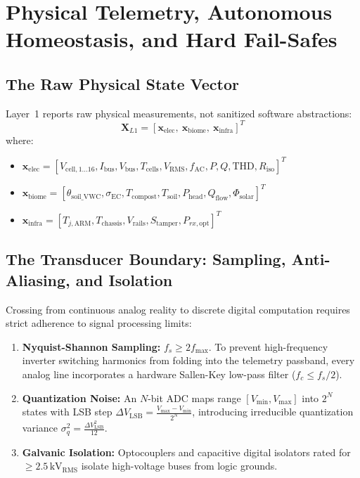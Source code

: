 \section{Physical Telemetry, Autonomous Homeostasis, and Hard Fail-Safes}
\label{sec:l1_telemetry_failsafes}

\subsection{The Raw Physical State Vector}

Layer~1 reports raw physical measurements, not sanitized software abstractions:
\begin{equation}
\mathbf{X}_{L1} = \left[ \mathbf{x}_{\mathrm{elec}}, \ \mathbf{x}_{\mathrm{biome}}, \ \mathbf{x}_{\mathrm{infra}} \right]^T
\label{eq:raw_state_vector}
\end{equation}
where:
\begin{itemize}
    \item $\mathbf{x}_{\mathrm{elec}} = [V_{\mathrm{cell},1\dots 16}, I_{\mathrm{bus}}, V_{\mathrm{bus}}, T_{\mathrm{cells}}, V_{\mathrm{RMS}}, f_{\mathrm{AC}}, P, Q, \mathrm{THD}, R_{\mathrm{iso}}]^T$
    \item $\mathbf{x}_{\mathrm{biome}} = [\theta_{\mathrm{soil\_VWC}}, \sigma_{\mathrm{EC}}, T_{\mathrm{compost}}, T_{\mathrm{soil}}, P_{\mathrm{head}}, Q_{\mathrm{flow}}, \Phi_{\mathrm{solar}}]^T$
    \item $\mathbf{x}_{\mathrm{infra}} = [T_{j,\mathrm{ARM}}, T_{\mathrm{chassis}}, V_{\mathrm{rails}}, S_{\mathrm{tamper}}, P_{rx,\mathrm{opt}}]^T$
\end{itemize}

\subsection{The Transducer Boundary: Sampling, Anti-Aliasing, and Isolation}

Crossing from continuous analog reality to discrete digital computation requires strict adherence to signal processing limits:
\begin{enumerate}
    \item \textbf{Nyquist-Shannon Sampling:} $f_s \ge 2 f_{\max}$. To prevent high-frequency inverter switching harmonics from folding into the telemetry passband, every analog line incorporates a hardware Sallen-Key low-pass filter ($f_c \le f_s / 2$).
    \item \textbf{Quantization Noise:} An $N$-bit ADC maps range $[V_{\min}, V_{\max}]$ into $2^N$ states with LSB step $\Delta V_{\mathrm{LSB}} = \frac{V_{\max}-V_{\min}}{2^N}$, introducing irreducible quantization variance $\sigma_q^2 = \frac{\Delta V_{\mathrm{LSB}}^2}{12}$.
    \item \textbf{Galvanic Isolation:} Optocouplers and capacitive digital isolators rated for $\ge 2.5\,\mathrm{kV}_{\mathrm{RMS}}$ isolate high-voltage buses from logic grounds.
\end{enumerate}

